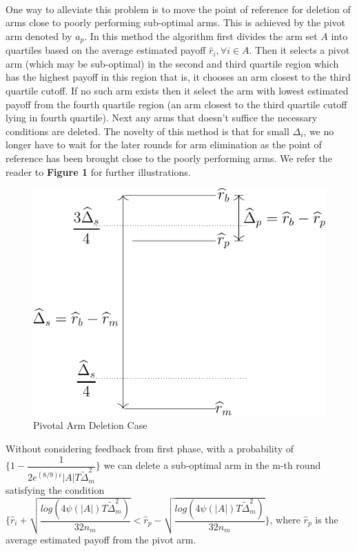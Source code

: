 \paragraph*{}One way to alleviate this problem is to move the point of reference for deletion of arms close to poorly performing sub-optimal arms. This is achieved by the pivot arm denoted by $a_{p}$. In this method the algorithm first divides the arm set $A$ into quartiles based on the average estimated payoff $\hat{r}_{i}, \forall i \in A$. Then it selects a pivot arm (which may be sub-optimal) in the second and third quartile region which has the highest payoff in this region that is, it chooses an arm closest to the third quartile cutoff. If no such arm exists then it select the arm with lowest estimated payoff from the fourth quartile region (an arm closest to the third quartile cutoff lying in fourth quartile). Next any arms that doesn't suffice the necessary conditions are deleted. The novelty of this method is that for small $\Delta_{i}$, we no longer have to wait for the later rounds for arm elimination as the point of reference has been brought close to the poorly performing arms. We refer the reader to \textbf{Figure 1} for further illustrations.

\begin{figure}
\includegraphics[scale=0.7]{img/diag1.pdf}
\caption{Pivotal Arm Deletion Case}
\end{figure}

\begin{theorem}
Without considering feedback from first phase, with a probability of $\bigg\lbrace 1-\dfrac{1}{2e^{(8/9)\epsilon}|A|T\tilde{\Delta}_{m}^{2}}\bigg\rbrace$ we can delete a sub-optimal arm in the m-th round satisfying the condition $\bigg\lbrace\hat{r}_{i}+\sqrt{\dfrac{log({4\psi(|A|)T\tilde{\Delta}_{m}^{2}})}{32n_{m}}} < \hat{r}_{p}-\sqrt{\dfrac{log({4\psi(|A|)T\tilde{\Delta}_{m}^{2}})}{32n_{m}}}\bigg\rbrace$, where $\hat{r}_{p}$ is the average estimated payoff from the pivot arm.
\end{theorem}

